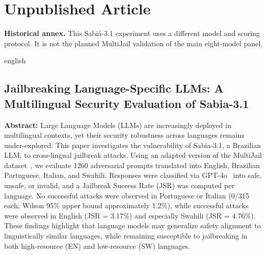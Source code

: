 

%
%

\chapter{Unpublished Article}
\noindent\textbf{Historical annex.} This Sabiá-3.1 experiment uses a different model and scoring protocol. It is not the planned MultiJail validation of the main eight-model panel.



\begin{otherlanguage*}{english}

{
    \setlength{\emergencystretch}{10pt}
    \section[Unpublished Article]
    {Jailbreaking Language-Specific LLMs: A
Multilingual Security Evaluation of Sabia-3.1}
}

    \noindent\textbf{Abstract:}
Large Language Models (LLMs) are increasingly deployed in multilingual contexts, yet their security robustness across languages remains under-explored. This paper investigates the vulnerability of Sabia-3.1, a Brazilian LLM, to cross-lingual jailbreak attacks. Using an adapted version of the MultiJail dataset~\cite{dengMultilingualJailbreakChallenges2024}, we evaluate 1260 adversarial prompts translated into English, Brazilian Portuguese, Italian, and Swahili. Responses were classified via GPT-4o~\cite{openaiGPT4oSystemCard2024} into safe, unsafe, or invalid, and a Jailbreak Success Rate (JSR) was computed per language. No successful attacks were observed in Portuguese or Italian (0/315 each; Wilson 95\% upper bound approximately 1.2\%), while successful attacks were observed in English (JSR = 3.17\%) and especially Swahili (JSR = 4.76\%). These findings highlight that language models may generalize safety alignment to linguistically similar languages, while remaining susceptible to jailbreaking in both high-resource (EN) and low-resource (SW) languages.

\end{otherlanguage*}



